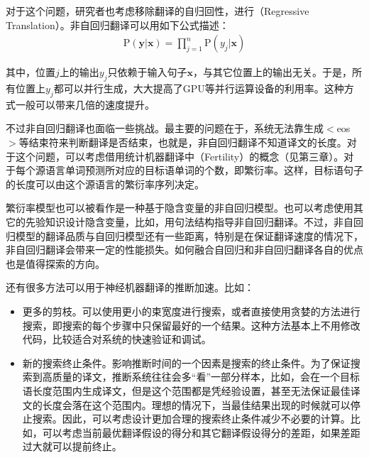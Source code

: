 \parinterval 对于这个问题，研究者也考虑移除翻译的自归回性\cite{Gu2017NonAutoregressiveNM}，进行{\small{}}（Regressive Translation）。非自回归翻译可以用如下公式描述：
\begin{eqnarray}
\textrm{P}(\mathbf{y}|\mathbf{x}) = \prod_{j=1}^{n} \textrm{P}(y_j| \mathbf{x})
\label{eq:7-7}
\end{eqnarray}

\noindent 其中，位置$j$上的输出$y_j$只依赖于输入句子$\mathbf{x}$，与其它位置上的输出无关。于是，所有位置上$y_j$都可以并行生成，大大提高了GPU等并行运算设备的利用率。这种方式一般可以带来几倍的速度提升。

\parinterval 不过非自回归翻译也面临一些挑战。最主要的问题在于，系统无法靠生成$<$eos$>$等结束符来判断翻译是否结束，也就是，非自回归翻译不知道译文的长度。对于这个问题，可以考虑借用统计机器翻译中{\small{}}（Fertility）的概念（见第三章）。对于每个源语言单词预测所对应的目标语单词的个数，即繁衍率。这样，目标语句子的长度可以由这个源语言的繁衍率序列决定。

\parinterval 繁衍率模型也可以被看作是一种基于隐含变量的非自回归模型。也可以考虑使用其它的先验知识设计隐含变量，比如，用句法结构指导非自回归翻译\cite{Gu2017NonAutoregressiveNM}。不过，非自回归模型的翻译品质与自回归模型还有一些距离，特别是在保证翻译速度的情况下，非自回归翻译会带来一定的性能损失。如何融合自回归和非自回归翻译各自的优点也是值得探索的方向。

\vspace{0.5em}
\vspace{0.5em}

\parinterval 还有很多方法可以用于神经机器翻译的推断加速。比如：

\begin{itemize}
\vspace{0.5em}
\item 更多的剪枝。可以使用更小的束宽度进行搜索，或者直接使用贪婪的方法进行搜索，即搜索的每个步骤中只保留最好的一个结果。这种方法基本上不用修改代码，比较适合对系统的快速验证和调试。
\vspace{0.5em}
\item 新的搜索终止条件。影响推断时间的一个因素是搜索的终止条件。为了保证搜索到高质量的译文，推断系统往往会多``看''一部分样本，比如，会在一个目标语长度范围内生成译文，但是这个范围都是凭经验设置，甚至无法保证最佳译文的长度会落在这个范围内。理想的情况下，当最佳结果出现的时候就可以停止搜索。因此，可以考虑设计更加合理的搜索终止条件减少不必要的计算\cite{DBLP:conf/emnlp/HuangZM17}。比如，可以考虑当前最优翻译假设的得分和其它翻译假设得分的差距，如果差距过大就可以提前终止。
\vspace{0.5em}
\end{itemize}

